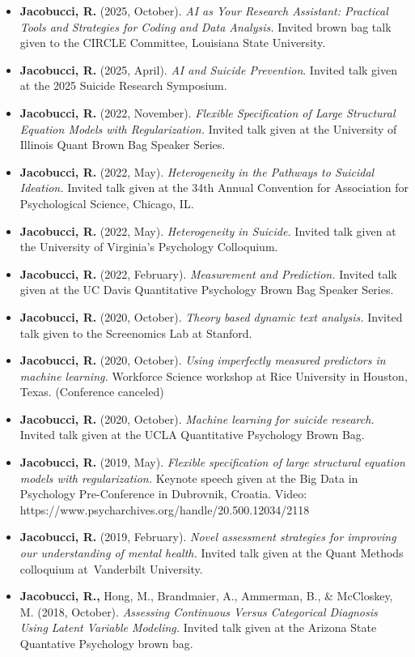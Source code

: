 \documentclass[letterpaper,10pt]{article}
\begin{document}
\begin{itemize}
	\item[]\textbf{Jacobucci, R.} (2025, October). \emph{AI as Your Research Assistant: Practical Tools and Strategies for Coding and Data Analysis.} Invited brown bag talk given to the CIRCLE Committee, Louisiana State University.
	\item[] \textbf{Jacobucci, R.} (2025, April). \emph{AI and Suicide Prevention}. Invited talk given at the 2025 Suicide Research Symposium. 
	\item[]\textbf{Jacobucci, R.} (2022, November). \emph{Flexible Specification of Large Structural Equation Models with Regularization.} Invited talk given at the University of Illinois Quant Brown Bag Speaker Series.
	\item[]\textbf{Jacobucci, R.} (2022, May). \emph{Heterogeneity in the Pathways to Suicidal Ideation.} Invited talk given at the 34th Annual Convention for Association for Psychological Science, Chicago, IL.
	\item[]\textbf{Jacobucci, R.} (2022, May). \emph{Heterogeneity in Suicide.} Invited talk given at the University of Virginia's Psychology Colloquium.
	\item[]\textbf{Jacobucci, R.} (2022, February). \emph{Measurement and Prediction.} Invited talk given at the UC Davis Quantitative Psychology Brown Bag Speaker Series.
	\item[]\textbf{Jacobucci, R.} (2020, October). \emph{Theory based dynamic text analysis.} Invited talk given to the Screenomics Lab at Stanford.
	\item[]\textbf{Jacobucci, R.} (2020, October). \emph{Using imperfectly measured predictors in machine learning.} Workforce Science workshop at Rice University in Houston, Texas. (Conference canceled)
	\item[]\textbf{Jacobucci, R.} (2020, October). \emph{Machine learning for suicide research.} Invited talk given at the UCLA Quantitative Psychology Brown Bag.
	\item[]\textbf{Jacobucci, R.} (2019, May). \emph{Flexible specification of large structural equation models with regularization.} Keynote speech given at the Big Data in Psychology Pre-Conference in Dubrovnik, Croatia. Video: https://www.psycharchives.org/handle/20.500.12034/2118
	\item[]\textbf{Jacobucci, R.} (2019, February). \emph{Novel assessment strategies for improving our understanding of mental health.} Invited talk given at the Quant Methods colloquium at Vanderbilt University.
	\item[]\textbf{Jacobucci, R.,} Hong, M., Brandmaier, A., Ammerman, B., \& McCloskey, M. (2018, October). \emph{Assessing Continuous Versus Categorical Diagnosis Using Latent Variable Modeling.} Invited talk given at the Arizona State Quantative Psychology brown bag.

\end{itemize}
\end{document}
